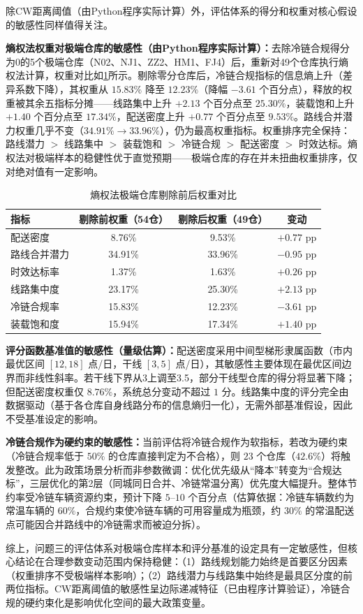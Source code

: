 除CW距离阈值（由Python程序实际计算）外，评估体系的得分和权重对核心假设的敏感性同样值得关注。

\textbf{熵权法权重对极端仓库的敏感性（由Python程序实际计算）：}去除冷链合规得分为0的5个极端仓库（N02、NJ1、ZZ2、HM1、FJ4）后，重新对49个仓库执行熵权法计算，权重对比如\cref{tab:entropy-sens}所示。剔除零分仓库后，冷链合规指标的信息熵上升（差异系数下降），其权重从 $15.83\%$ 降至 $12.23\%$（降幅 $-3.61$ 个百分点），释放的权重被其余五指标分摊——线路集中上升 $+2.13$ 个百分点至 $25.30\%$，装载饱和上升 $+1.40$ 个百分点至 $17.34\%$，配送密度上升 $+0.77$ 个百分点至 $9.53\%$。路线合并潜力权重几乎不变（$34.91\% \to 33.96\%$），仍为最高权重指标。权重排序完全保持：路线潜力 $>$ 线路集中 $>$ 装载饱和 $>$ 冷链合规 $>$ 配送密度 $>$ 时效达标。熵权法对极端样本的稳健性优于直觉预期——极端仓库的存在并未扭曲权重排序，仅对绝对值有一定影响。

\begin{table}[!h]
    \centering
    \begin{tabular}{lccc}
        \toprule[1.5pt]
        指标 & 剔除前权重（54仓）& 剔除后权重（49仓）& 变动 \\
        \midrule[1pt]
        配送密度 & 8.76\% & 9.53\% & $+0.77$ pp \\
        路线合并潜力 & 34.91\% & 33.96\% & $-0.95$ pp \\
        时效达标率 & 1.37\% & 1.63\% & $+0.26$ pp \\
        线路集中度 & 23.17\% & 25.30\% & $+2.13$ pp \\
        冷链合规率 & 15.83\% & 12.23\% & $-3.61$ pp \\
        装载饱和度 & 15.94\% & 17.34\% & $+1.40$ pp \\
        \bottomrule[1.5pt]
    \end{tabular}\caption{熵权法极端仓库剔除前后权重对比}
    \label{tab:entropy-sens}
\end{table}

\textbf{评分函数基准值的敏感性（量级估算）：}配送密度采用中间型梯形隶属函数（市内最优区间 $[12, 18]$ 点/日，干线 $[3, 5]$ 点/日），其敏感性主要体现在最优区间边界而非线性斜率。若干线下界从3上调至3.5，部分干线型仓库的得分将显著下降；但配送密度权重仅 $8.76\%$，系统总分变动不超过 $1$ 分。线路集中度的评分完全由数据驱动（基于各仓库自身线路分布的信息熵归一化），无需外部基准假设，因此不受基准设定的影响。

\textbf{冷链合规作为硬约束的敏感性：}当前评估将冷链合规作为软指标，若改为硬约束（冷链合规率低于 $50\%$ 的仓库直接判定为不合格），则 $23$ 个仓库（$42.6\%$）将触发整改。此为政策场景分析而非参数微调：优化优先级从“降本”转变为“合规达标”，三层优化的第2层（同城同日合并、冷链常温分离）优先度大幅提升。整体节约率受冷链车辆资源约束，预计下降 $5$–$10$ 个百分点（估算依据：冷链车辆数约为常温车辆的 $60\%$，合规约束使冷链车辆的可用容量成为瓶颈，约 $30\%$ 的常温配送点可能因合并路线中的冷链需求而被迫分拆）。

综上，问题三的评估体系对极端仓库样本和评分基准的设定具有一定敏感性，但核心结论在合理参数变动范围内保持稳健：（1）路线规划能力始终是首要区分因素（权重排序不受极端样本影响）；（2）路线潜力与线路集中始终是最具区分度的前两位指标。CW距离阈值的敏感性呈边际递减特征（已由程序计算验证），冷链合规的硬约束化是影响优化空间的最大政策变量。
